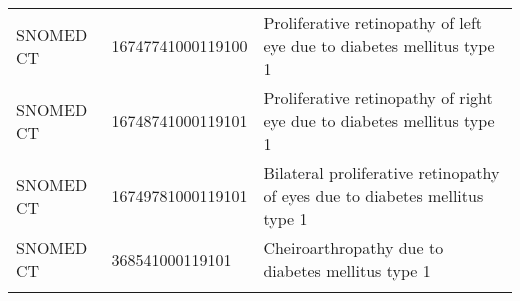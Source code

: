 \begin{longtable}{p{}p{}p{}}
  SNOMED CT & 16747741000119100 & Proliferative retinopathy of left eye due to diabetes mellitus type 1 \\ 
  SNOMED CT & 16748741000119101 & Proliferative retinopathy of right eye due to diabetes mellitus type 1 \\ 
  SNOMED CT & 16749781000119101 & Bilateral proliferative retinopathy of eyes due to diabetes mellitus type 1 \\ 
  SNOMED CT & 368541000119101 & Cheiroarthropathy due to diabetes mellitus type 1 \\ 
  \hline
\label{tab:codes_type-1-diabetes}
\end{longtable}
